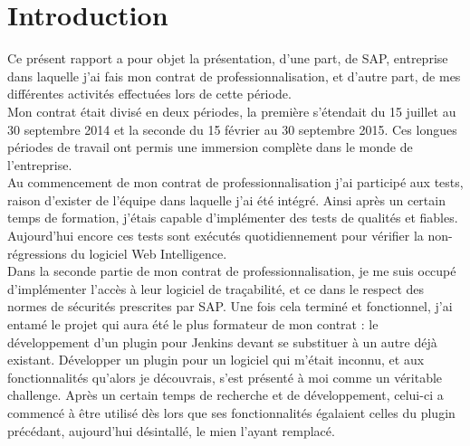 \chapter*{Introduction}

Ce présent rapport a pour objet la présentation, d'une part, de SAP, entreprise dans laquelle j'ai fais mon contrat de professionnalisation, et d'autre part, de mes différentes activités effectuées lors de cette période.\\

Mon contrat était divisé en deux périodes, la première s'étendait du 15 juillet au 30 septembre 2014 et la seconde du 15 février au 30 septembre 2015. Ces longues périodes de travail ont permis une immersion complète dans le monde de l'entreprise.\\


Au commencement de mon contrat de professionnalisation j'ai participé aux tests, raison d'exister de l'équipe dans laquelle j'ai été intégré. Ainsi après un certain temps de formation, j'étais capable d'implémenter des tests de qualités et fiables. Aujourd'hui encore ces tests sont exécutés quotidiennement pour vérifier la non-régressions du logiciel Web Intelligence.\\
Dans la seconde partie de mon contrat de professionnalisation, je me suis occupé d'implémenter l'accès \`{a} leur logiciel de traçabilité, et ce dans le respect des normes de sécurités prescrites par SAP. Une fois cela terminé et fonctionnel, j'ai entamé le projet qui aura été le plus formateur de mon contrat : le développement d'un plugin pour Jenkins devant se substituer à un autre déjà existant. Développer un plugin pour un logiciel qui m'était inconnu, et aux fonctionnalités qu'alors je découvrais, s'est présenté à moi comme un véritable challenge. Après un certain temps de recherche et de développement, celui-ci a commencé à être utilisé dès lors que ses fonctionnalités égalaient celles du plugin précédant, aujourd'hui désintallé, le mien l'ayant remplacé.\\